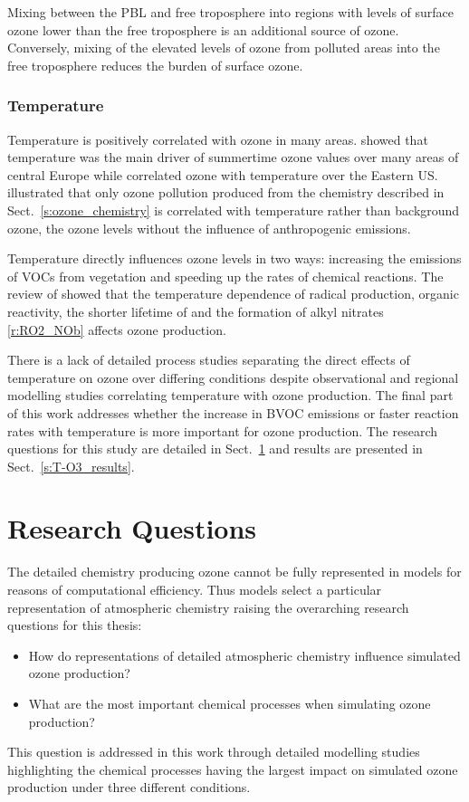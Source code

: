 Mixing between the PBL and free troposphere into regions with levels of surface ozone lower than the free troposphere is an additional source of ozone.
Conversely, mixing of the elevated levels of ozone from polluted areas into the free troposphere reduces the burden of surface ozone.

\subsubsection{Temperature}
Temperature is positively correlated with ozone in many areas.
\citet{Otero:2016} showed that temperature was the main driver of summertime ozone values over many areas of central Europe while \citet{Camalier:2007} correlated ozone with temperature over the Eastern US.
\citet{Sillman:1995a} illustrated that only ozone pollution produced from the chemistry described in Sect.~\ref{s:ozone_chemistry} is correlated with temperature rather than background ozone, the ozone levels without the influence of anthropogenic emissions.

Temperature directly influences ozone levels in two ways: increasing the emissions of VOCs from vegetation and speeding up the rates of chemical reactions.
The review of \citet{Pusede:2015} showed that the temperature dependence of radical production, organic reactivity, the shorter lifetime of  and the formation of alkyl nitrates \eqref{r:RO2_NOb} affects ozone production.

There is a lack of detailed process studies separating the direct effects of temperature on ozone over differing  conditions despite observational and regional modelling studies correlating temperature with ozone production. 
The final part of this work addresses whether the increase in BVOC emissions or faster reaction rates with temperature is more important for ozone production.
The research questions for this study are detailed in Sect.~\ref{s:research_questions} and results are presented in Sect.~\ref{s:T-O3_results}.

\section{Research Questions} \label{s:research_questions}
The detailed chemistry producing ozone cannot be fully represented in models for reasons of computational efficiency.
Thus models select a particular representation of atmospheric chemistry raising the overarching research questions for this thesis:
\begin{itemize}
    \item How do representations of detailed atmospheric chemistry influence simulated ozone production?
    \item What are the most important chemical processes when simulating ozone production?
\end{itemize}
This question is addressed in this work through detailed modelling studies highlighting the chemical processes having the largest impact on simulated ozone production under three different conditions.

